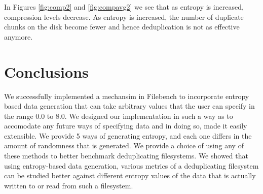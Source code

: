 In Figures \ref{fig:comp2} and \ref{fig:compavg2} we see that as entropy is increased, compression levels decrease. As entropy is increased, the number of duplicate chunks on the disk become fewer and hence deduplication is not as effective anymore.

\chapter{Conclusions}\label{chap:conc}
\noindent We successfully implemented a mechansim in Filebench to incorporate entropy based data generation that can take arbitrary values that the user can specify in the range 0.0 to 8.0. We designed our implementation in such a way as to accomodate any future ways of specifying data and in doing so, made it easily extensible. We provide 5 ways of generating entropy, and each one differs in the amount of randomness that is generated. We provide a choice of using any of these methods to better benchmark deduplicating filesystems.
\newline
\noindent We showed that using entropy-based data generation, various metrics of a deduplicating filesystem can be studied better against different entropy values of the data that is actually written to or read from such a filesystem.

